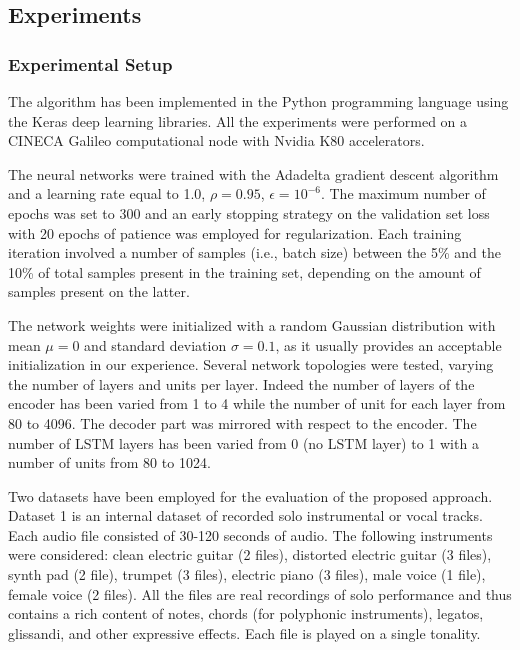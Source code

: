 \subsection{Experiments}\label{sec:experiments_audiox}
\subsubsection{Experimental Setup}
The algorithm has been implemented in the Python programming language using the Keras deep learning libraries. All the experiments were performed on a CINECA Galileo computational node with Nvidia K80 accelerators.

The neural networks were trained with the Adadelta gradient descent algorithm and a learning rate equal to 1.0, $\rho=0.95$, $\epsilon=10^{-6}$. The maximum number of epochs was set to 300 and an early stopping strategy on the validation set loss with 20 epochs of patience was employed for regularization. Each training iteration involved a number of samples (i.e., batch size) between the 5\% and the 10\% of total samples present in the training set, depending on the amount of samples present on the latter. 

The network weights were initialized with a random Gaussian distribution with mean $\mu=0$ and standard deviation $\sigma=0.1$, as it usually provides an acceptable initialization in our experience. Several network topologies were tested, varying the number of layers and units per layer.
Indeed the number of layers of the encoder has been varied from 1 to 4 while the number of unit for each layer from 80 to 4096. The decoder part was mirrored with respect to the encoder. The number of LSTM layers has been varied from  0 (no LSTM layer) to 1 with a number of units from 80 to 1024.


Two datasets have been employed for the evaluation of the proposed approach. Dataset 1 is an internal dataset of recorded solo instrumental or vocal tracks. Each audio file consisted of 30-120 seconds of audio. The following instruments were considered: clean electric guitar (2 files), distorted electric guitar (3 files), synth pad (2 file), trumpet (3 files), electric piano (3 files), male voice (1 file), female voice (2 files). All the files are real recordings of solo performance and thus contains a rich content of notes, chords (for polyphonic instruments), legatos, glissandi, and other expressive effects. Each file is played on a single tonality.

